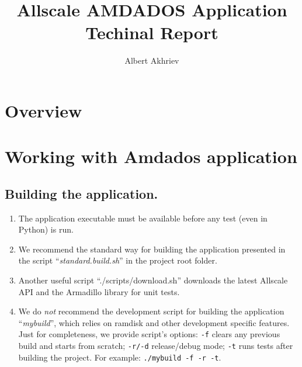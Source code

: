\documentclass[]{article}
\title{Allscale AMDADOS Application \\ Techinal Report}
\author{Albert Akhriev}
\begin{document}
\maketitle

\section{Overview}



\section{Working with Amdados application}

\subsection{Building the application.}
\begin{enumerate}
\item The application executable must be available before any test (even in Python) is run.
\item We recommend the standard way for building the application presented in the script ``\textit{standard.build.sh}'' in the project root folder.
\item Another useful script ``./scripts/download.sh'' downloads the latest Allscale API and the Armadillo library for unit tests.
\item We do \textit{not} recommend the development script for building the application ``\textit{mybuild}'', which relies on ramdisk and other development specific features. Just for completeness, we provide script's options: \texttt{-f} clears any previous build and starts from scratch; \texttt{-r/-d} release/debug mode; \texttt{-t} runs tests after building the project. For example: \texttt{./mybuild -f -r -t}.
\end{enumerate}
\end{document}

